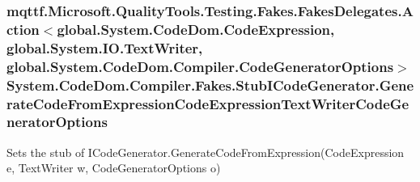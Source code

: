 \hypertarget{class_system_1_1_code_dom_1_1_compiler_1_1_fakes_1_1_stub_i_code_generator_af3f2a6d0f58b28dc41cb8dafa1a63375}{
\subsubsection[{Generate\-Code\-From\-Expression\-Code\-Expression\-Text\-Writer\-Code\-Generator\-Options}]{\setlength{\rightskip}{0pt plus 5cm}mqttf.\-Microsoft.\-Quality\-Tools.\-Testing.\-Fakes.\-Fakes\-Delegates.\-Action$<$global.\-System.\-Code\-Dom.\-Code\-Expression, global.\-System.\-I\-O.\-Text\-Writer, global.\-System.\-Code\-Dom.\-Compiler.\-Code\-Generator\-Options$>$ System.\-Code\-Dom.\-Compiler.\-Fakes.\-Stub\-I\-Code\-Generator.\-Generate\-Code\-From\-Expression\-Code\-Expression\-Text\-Writer\-Code\-Generator\-Options}}\label{class_system_1_1_code_dom_1_1_compiler_1_1_fakes_1_1_stub_i_code_generator_af3f2a6d0f58b28dc41cb8dafa1a63375}


Sets the stub of I\-Code\-Generator.\-Generate\-Code\-From\-Expression(\-Code\-Expression e, Text\-Writer w, Code\-Generator\-Options o)

